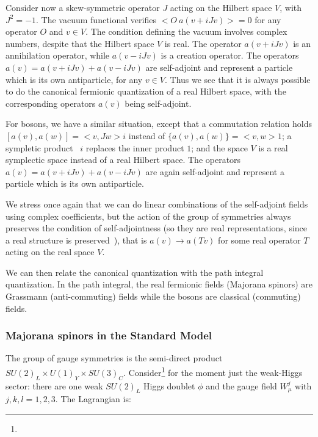 \documentclass[11pt]{book}
\begin{document}
Consider now a skew-symmetric operator \(J\) acting on the Hilbert space
\(V\), with \(J^2=-1\). The vacuum functional verifies
\(<O\ a(v+iJ v)>=0\) for any operator \(O\) and \(v \in V\). The
condition defining the vacuum involves complex numbers, despite that the
Hilbert space \(V\) is real. The operator \(a( v+iJ v)\) is an
annihilation operator, while \(a( v-iJ v)\) is a creation operator. The
operators \(a( v)=a(v+iJ v)+a(v-iJ v)\) are self-adjoint and represent a
particle which is its own antiparticle, for any \(v\in V\). Thus we see
that it is always possible to do the canonical fermionic quantization of
a real Hilbert space, with the corresponding operators \(a(v)\) being
self-adjoint.

For bosons, we have a similar situation, except that a commutation
relation holds\\
\([a(v),a(w)]=<v, J w> i\) instead of \(\{a(v),a(w)\}=<v, w> 1\); a
sympletic product~\cite{Ottesen1995Infinite}\cite{Everitt2004Infinite}\cite{Dereziux144ski2013Mathematics} \(<v, J w>i\) replaces the inner product \(<v,w>1\);
and the space \(V\) is a real symplectic space instead of a real Hilbert
space. The operators \(a(v)=a(v+iJ v)+a(v-iJ v)\) are again self-adjoint
and represent a particle which is its own antiparticle.

We stress once again that we can do linear combinations of the
self-adjoint fields using complex coefficients, but the action of the
group of symmetries always preserves the condition of self-adjointness
(so they are real representations, since a real structure is
preserved~\cite{Oniux161ux10dik2004Lectures}), that is \(a(v)\to a(T v)\) for some
real operator \(T\) acting on the real space \(V\).

We can then relate the canonical quantization with the path integral
quantization. In the path integral, the real fermionic fields (Majorana
spinors) are Grassmann (anti-commuting) fields while the bosons are
classical (commuting) fields.

\hypertarget{majorana-spinors-in-the-standard-model}{%
\subsubsection{Majorana spinors in the Standard
Model}\label{majorana-spinors-in-the-standard-model}}

The group of gauge symmetries is the semi-direct product
\(SU(2)_L\times U(1)_Y \times SU(3)_C\). Consider\footnote{} for the
moment just the weak-Higgs sector: there are one weak \(SU(2)_L\) Higgs
doublet \(\phi\) and the gauge field \(W_\mu^j\) with \(j,k,l=1,2,3\).
The Lagrangian is:
\end{document}
